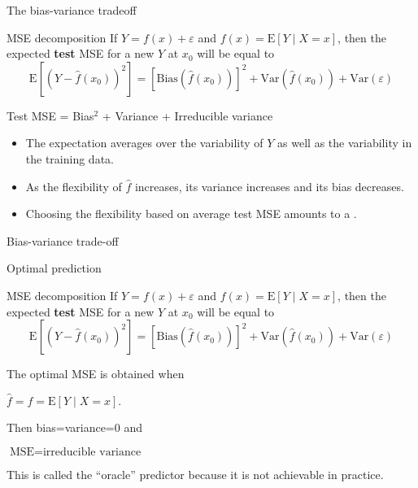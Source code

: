 \documentclass[14pt]{beamer}
\begin{document}
\begin{frame}{The bias-variance tradeoff}

\begin{alertblock}{MSE decomposition}
If $Y = f(x) + \varepsilon$ and $f(x)=\text{E}[Y\mid X=x]$, then the expected \textbf{test} MSE for a new $Y$ at $x_0$ will be equal to\vspace*{-0.3cm}
$$\text{E}[(Y-\hat{f}(x_0))^2] = [\text{Bias}(\hat{f}(x_0))]^2 + \text{Var}(\hat{f}(x_0)) + \text{Var}(\varepsilon)$$
\end{alertblock}
\begin{block}{}
Test MSE = Bias$^2$ + Variance + Irreducible variance
\end{block}
\begin{itemize}
\item The expectation averages over the variability of $Y$ as well as the variability in the training data.
\item As the flexibility of $\hat{f}$ increases, its variance increases and its bias decreases.
\item Choosing the flexibility based on average test MSE amounts to a .
\end{itemize}
\end{frame}

\begin{frame}{Bias-variance trade-off}
\end{frame}

\begin{frame}{Optimal prediction}
\begin{alertblock}{MSE decomposition}
If $Y = f(x) + \varepsilon$ and $f(x)=\text{E}[Y\mid X=x]$, then the expected \textbf{test} MSE for a new $Y$ at $x_0$ will be equal to\vspace*{-0.3cm}
$$\text{E}[(Y-\hat{f}(x_0))^2] = [\text{Bias}(\hat{f}(x_0))]^2 + \text{Var}(\hat{f}(x_0)) + \text{Var}(\varepsilon)$$
\end{alertblock}

The optimal MSE is obtained when 
\begin{block}{}
\centerline{$\hat{f}=f = \text{E}[Y\mid X=x].$}
\end{block}
Then bias=variance=0 and
\begin{block}{}
\centerline{$\text{MSE} = \text{irreducible variance}$}
\end{block}
This is called the \alert{``oracle'' predictor} because it is not achievable in practice.

\end{frame}
\end{document}
